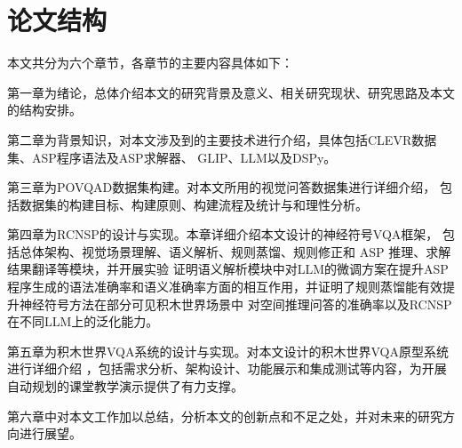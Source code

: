 \section{论文结构}
本文共分为六个章节，各章节的主要内容具体如下：

第一章为绪论，总体介绍本文的研究背景及意义、相关研究现状、研究思路及本文的结构安排。

第二章为背景知识，对本文涉及到的主要技术进行介绍，具体包括CLEVR数据集、ASP程序语法及ASP求解器、
GLIP、LLM以及DSPy。

第三章为POVQAD数据集构建。对本文所用的视觉问答数据集进行详细介绍，
包括数据集的构建目标、构建原则、构建流程及统计与和理性分析。

第四章为RCNSP的设计与实现。本章详细介绍本文设计的神经符号VQA框架，
包括总体架构、视觉场景理解、语义解析、规则蒸馏、规则修正和 ASP 推理、求解结果翻译等模块，并开展实验
证明语义解析模块中对LLM的微调方案在提升ASP程序生成的语法准确率和语义准确率方面的相互作用，并证明了规则蒸馏能有效提升神经符号方法在部分可见积木世界场景中
对空间推理问答的准确率以及RCNSP在不同LLM上的泛化能力。

第五章为积木世界VQA系统的设计与实现。对本文设计的积木世界VQA原型系统进行详细介绍
，包括需求分析、架构设计、功能展示和集成测试等内容，为开展自动规划的课堂教学演示提供了有力支撑。

第六章中对本文工作加以总结，分析本文的创新点和不足之处，并对未来的研究方向进行展望。